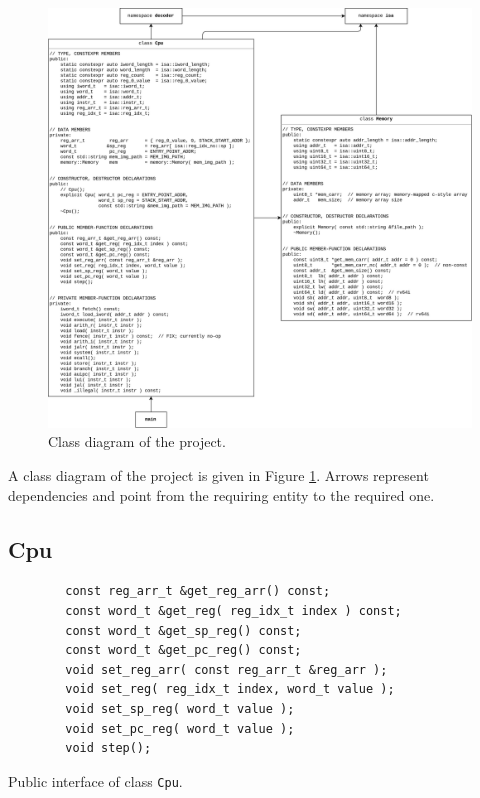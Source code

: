 \documentclass[a4paper]{amsart}
\begin{document}
\begin{figure}
    \centering
    \includegraphics[width=1\columnwidth]{class_diag}
    \caption{Class diagram of the project.}
    \label{fig:class_diag}
\end{figure}

\noindent
A class diagram of the project is given in Figure \ref{fig:class_diag}.
Arrows represent dependencies and point from the requiring entity to the required one.


\medbreak
\subsection{Cpu}

\begin{listing}
    \begin{verbatim}
        const reg_arr_t &get_reg_arr() const;
        const word_t &get_reg( reg_idx_t index ) const;
        const word_t &get_sp_reg() const;
        const word_t &get_pc_reg() const;
        void set_reg_arr( const reg_arr_t &reg_arr );
        void set_reg( reg_idx_t index, word_t value );
        void set_sp_reg( word_t value );
        void set_pc_reg( word_t value );
        void step();
    \end{verbatim}
    \caption{Public interface of class \texttt{Cpu}.}
    \label{list:cpu_public_interface}
\end{listing}
\end{document}
